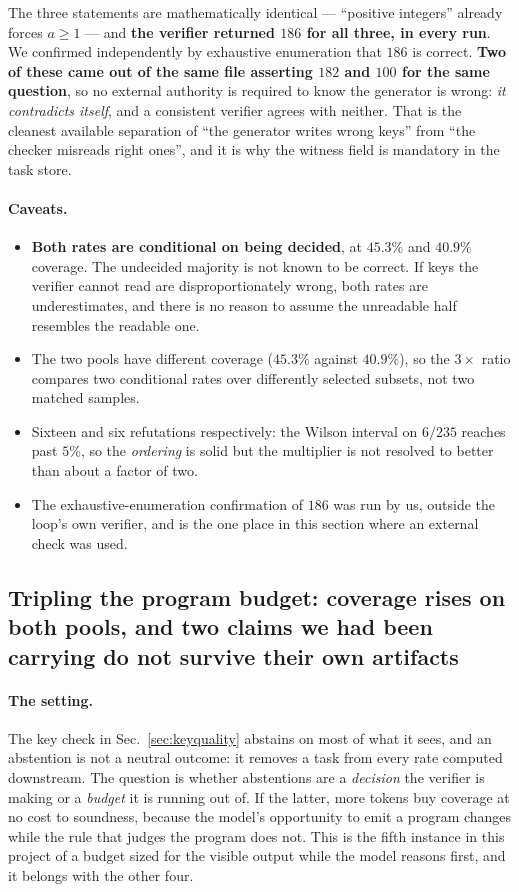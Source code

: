 The three statements are mathematically identical --- ``positive integers'' already forces
$a \ge 1$ --- and \textbf{the verifier returned $186$ for all three, in every run}. We
confirmed independently by exhaustive enumeration that $186$ is correct. \textbf{Two of these
came out of the same file asserting $182$ and $100$ for the same question}, so no external
authority is required to know the generator is wrong: \emph{it contradicts itself}, and a
consistent verifier agrees with neither. That is the cleanest available separation of ``the
generator writes wrong keys'' from ``the checker misreads right ones'', and it is why the
witness field is mandatory in the task store.

\paragraph{Caveats.}
\begin{itemize}
\item \textbf{Both rates are conditional on being decided}, at $45.3\%$ and $40.9\%$ coverage.
The undecided majority is not known to be correct. If keys the verifier cannot read are
disproportionately wrong, both rates are underestimates, and there is no reason to assume the
unreadable half resembles the readable one.
\item The two pools have different coverage ($45.3\%$ against $40.9\%$), so the $3\times$ ratio
compares two conditional rates over differently selected subsets, not two matched samples.
\item Sixteen and six refutations respectively: the Wilson interval on $6/235$ reaches past
$5\%$, so the \emph{ordering} is solid but the multiplier is not resolved to better than about
a factor of two.
\item The exhaustive-enumeration confirmation of $186$ was run by us, outside the loop's own
verifier, and is the one place in this section where an external check was used.
\end{itemize}

\subsection{Tripling the program budget: coverage rises on both pools, and two claims we had
been carrying do not survive their own artifacts}
\label{sec:coverage}

\paragraph{The setting.} The key check in Sec.~\ref{sec:keyquality} abstains on most of what it
sees, and an abstention is not a neutral outcome: it removes a task from every rate computed
downstream. The question is whether abstentions are a \emph{decision} the verifier is making or
a \emph{budget} it is running out of. If the latter, more tokens buy coverage at no cost to
soundness, because the model's opportunity to emit a program changes while the rule that judges
the program does not. This is the fifth instance in this project of a budget sized for the
visible output while the model reasons first, and it belongs with the other four.

